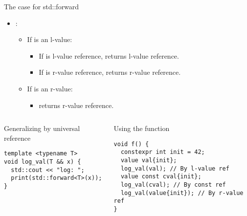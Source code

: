         
\begin{frame}[t,fragile]{The case for std::forward}
\begin{itemize}
  \item {}:
    \begin{itemize}
      \item If  is an l-value:
        \begin{itemize}
          \item If  is l-value reference,  returns l-value reference.
          \item If  is r-value reference,  returns r-value reference.
        \end{itemize}
      \item If  is an r-value:
        \begin{itemize}
          \item {} returns r-value reference.
        \end{itemize}
    \end{itemize}
\end{itemize}

\pause
\begin{columns}[T]

\begin{block}{Generalizing by universal reference}
\begin{lstlisting}
template <typename T>
void log_val(T && x) {
  std::cout << "log: ";
  print(std::forward<T>(x));
}
\end{lstlisting}
\end{block}

\begin{block}{Using the function}
\begin{lstlisting}
void f() {
  constexpr int init = 42;
  value val{init};
  log_val(val); // By l-value ref
  value const cval{init};
  log_val(cval); // By const ref
  log_val(value{init}); // By r-value ref
}
\end{lstlisting}
\end{block}

\end{columns}

\end{frame}
